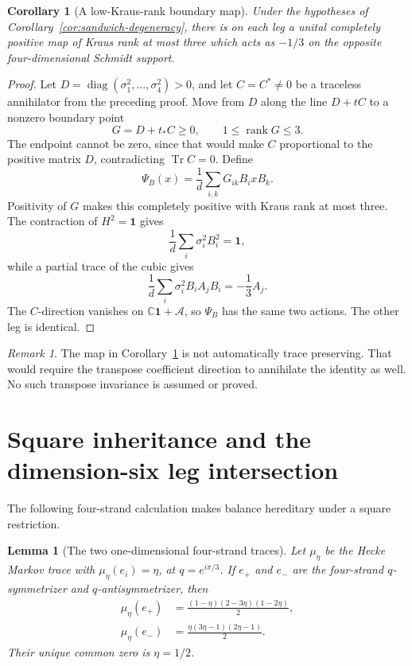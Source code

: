\documentclass[11pt]{article}
\newtheorem{lemma}[theorem]{Lemma}
\newtheorem{corollary}[theorem]{Corollary}
\theoremstyle{definition}
\theoremstyle{remark}
\newtheorem{remark}[theorem]{Remark}
\newcommand{\Id}{\mathbf 1}
\newcommand{\Tr}{\operatorname{Tr}}
\newcommand{\rank}{\operatorname{rank}}
\newcommand{\bbC}{\mathbb C}
\newcommand{\cA}{\mathcal A}
\begin{document}
\begin{corollary}[A low-Kraus-rank boundary map]\label{cor:cp-boundary}
Under the hypotheses of Corollary~\ref{cor:sandwich-degeneracy}, there is
on each leg a unital completely positive map of Kraus rank at most three
which acts as \(-1/3\) on the opposite four-dimensional Schmidt support.
\end{corollary}

\begin{proof}
Let \(D=\operatorname{diag}(\sigma_1^2,\ldots,\sigma_4^2)>0\), and let
\(C=C^*\ne0\) be a traceless annihilator from the preceding proof.
Move from \(D\) along the line \(D+tC\) to a nonzero boundary point
\[
  G=D+t_*C\ge0,\qquad 1\le\rank G\le3.
\]
The endpoint cannot be zero, since that would make \(C\) proportional to
the positive matrix \(D\), contradicting \(\Tr C=0\). Define
\[
  \Psi_B(x)
  =\frac1d\sum_{i,k}G_{ik}B_i xB_k.
\]
Positivity of \(G\) makes this completely positive with Kraus rank at most
three. The contraction of \(H^2=\Id\) gives
\[
  \frac1d\sum_i\sigma_i^2B_i^2=\Id,
\]
while a partial trace of the cubic gives
\[
  \frac1d\sum_i\sigma_i^2B_iA_jB_i=-\frac13A_j.
\]
The \(C\)-direction vanishes on \(\bbC\Id+\cA\), so \(\Psi_B\) has the
same two actions. The other leg is identical.
\end{proof}

\begin{remark}
The map in Corollary~\ref{cor:cp-boundary} is not automatically trace
preserving. That would require the transpose coefficient direction to
annihilate the identity as well. No such transpose invariance is assumed
or proved.
\end{remark}

\section{Square inheritance and the dimension-six leg intersection}
\label{sec:d6-frontier}

The following four-strand calculation makes balance hereditary under a
square restriction.

\begin{lemma}[The two one-dimensional four-strand traces]
\label{lem:four-strand-traces}
Let \(\mu_\eta\) be the Hecke Markov trace with
\(\mu_\eta(e_i)=\eta\), at \(q=e^{i\pi/3}\). If \(e_+\) and \(e_-\) are
the four-strand \(q\)-symmetrizer and \(q\)-antisymmetrizer, then
\begin{equation}
\begin{split}
 \mu_\eta(e_+)
 &=\frac{(1-\eta)(2-3\eta)(1-2\eta)}2,\\
 \mu_\eta(e_-)
 &=\frac{\eta(3\eta-1)(2\eta-1)}2.
\end{split}
\label{eq:four-strand-traces}
\end{equation}
Their unique common zero is \(\eta=1/2\).
\end{lemma}
\end{document}

